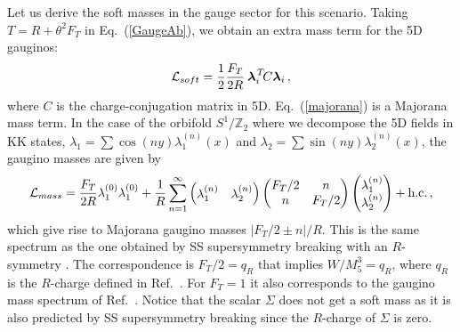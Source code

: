 \documentclass[a4paper,12pt]{article}
\newcommand{\Ft}{F_{T}}
\newcommand{\Zparity}{\ensuremath{\mathbb{Z}_2}}
\newcommand{\BLambda}{\boldsymbol{\lambda}}
\begin{document}
Let us derive the soft masses in the gauge sector
for this scenario.
Taking $T=R+\theta^2 F_T$
in Eq.~(\ref{GaugeAb}),  
we obtain an extra mass term for the 5D gauginos:
\begin{equation}
{\cal L}_{soft}=\frac{1}{2}\frac{\Ft}{2R}\:
    {\BLambda}_{i}^{\mspace{2mu}T}\! C {\BLambda}_{i}\, ,
\label{majorana}
\end{equation}
where $C$ is the charge-conjugation matrix in 5D.
Eq.~(\ref{majorana}) is a Majorana mass term.
In the case of the orbifold $S^1/\Zparity$
where 
we  decompose the 5D fields in KK states, 
$\lambda_1=\sum\cos(ny) \lambda^{(n)}_1(x)$ and
$\lambda_2=\sum\sin(ny) \lambda^{(n)}_2(x)$, 
the gaugino masses are given by
\begin{equation}
{\cal L}_{mass}=\frac{F_T}{2R}
\lambda_1^{(0)}\lambda_1^{(0)}+
\frac{1}{R}\sum_{n=1}^\infty
\begin{pmatrix}
    \lambda_{1}^{(n)} & \lambda_2^{(n)}
\end{pmatrix}
\begin{pmatrix}
    \Ft/2 & n \\
    n & \Ft/2
\end{pmatrix}
\begin{pmatrix}
    \lambda_1^{(n)}\\
    \lambda_2^{(n)}
\end{pmatrix}+\text{h.c.}\, ,
\end{equation}
which give rise to Majorana gaugino  masses $|\Ft/2\pm n|/R$.
This is the same spectrum as the one obtained by SS supersymmetry breaking
with an  $R$-symmetry \cite{pq}.
The correspondence is $F_T/2=q_R$ that implies $W/M^3_5=q_R$,  
where  $q_R$ is the $R$-charge defined in Ref.~\cite{pq}. 
For $F_T=1$
it also corresponds to the gaugino mass spectrum of Ref.~\cite{bhn}.
Notice that the scalar $\Sigma$ does not get a soft mass
as it is also predicted by SS supersymmetry breaking since the $R$-charge
of $\Sigma$ is zero.
\end{document}
